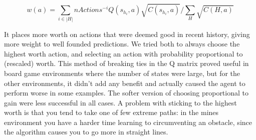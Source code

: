 \begin{equation}
	w(a) = \sum_{i \in |H|} nActions^{-i} Q(s_{h_i},a) \sqrt{C(s_{h_i},a)}/\sum_H \sqrt{C(H,a)}
\end{equation}

It places more worth on actions that were deemed good in recent history, giving
more weight to well founded predictions. We tried both to always choose the
highest worth action, and selecting an action with probability proportional to
(rescaled) worth. This method of breaking ties in the Q matrix proved useful in
board game environments  where the number of states were large, but for the
other environments, it didn't add any benefit and actually caused the agent to
perform worse in some examples. The softer version of choosing proportional to
gain were less successful in all cases. A problem with sticking to the highest
worth is that you tend to take one of few extreme paths: in the mines
environment you have a harder time learning to circumventing an obstacle, since
the algorithm causes you to go more in straight lines.
